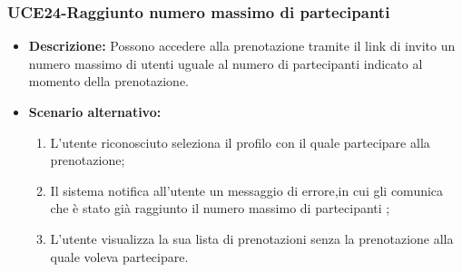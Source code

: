 \subsubsection{UCE24-Raggiunto numero massimo di partecipanti}
\begin{itemize}
    \item \textbf{Descrizione: }Possono accedere alla prenotazione tramite il link di
    invito un numero massimo di utenti uguale al numero di partecipanti indicato al momento della
    prenotazione.
    \item \textbf{Scenario alternativo: }
    \begin{enumerate}
        \item L'utente riconosciuto seleziona il profilo con il quale partecipare alla prenotazione;
        \item Il sistema notifica all'utente un messaggio di errore,in cui gli comunica che è stato
        già raggiunto il numero massimo di partecipanti ;
        \item L'utente visualizza la sua lista di prenotazioni senza la prenotazione alla quale voleva
        partecipare.
    \end{enumerate}
\end{itemize}

